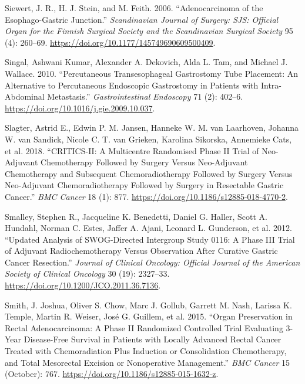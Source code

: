 \documentclass[
  letterpaper,
]{scrbook}
\newlength{\cslhangindent}
\newenvironment{CSLReferences}[2] %
 {\begin{list}{}{%
  \setlength{\itemindent}{0pt}
  \setlength{\leftmargin}{0pt}
  \setlength{\parsep}{0pt}
  \ifodd #1
   \setlength{\leftmargin}{\cslhangindent}
   \setlength{\itemindent}{-1\cslhangindent}
  \fi
  \setlength{\itemsep}{#2\baselineskip}}}
 {\end{list}}
\begin{document}
\begin{CSLReferences}{1}{0}
Siewert, J. R., H. J. Stein, and M. Feith. 2006. {``Adenocarcinoma of
the Esophago-Gastric Junction.''} \emph{Scandinavian Journal of Surgery:
SJS: Official Organ for the Finnish Surgical Society and the
Scandinavian Surgical Society} 95 (4): 260--69.
\url{https://doi.org/10.1177/145749690609500409}.

Singal, Ashwani Kumar, Alexander A. Dekovich, Alda L. Tam, and Michael
J. Wallace. 2010. {``Percutaneous Transesophageal Gastrostomy Tube
Placement: An Alternative to Percutaneous Endoscopic Gastrostomy in
Patients with Intra-Abdominal Metastasis.''} \emph{Gastrointestinal
Endoscopy} 71 (2): 402--6.
\url{https://doi.org/10.1016/j.gie.2009.10.037}.

Slagter, Astrid E., Edwin P. M. Jansen, Hanneke W. M. van Laarhoven,
Johanna W. van Sandick, Nicole C. T. van Grieken, Karolina Sikorska,
Annemieke Cats, et al. 2018. {``{CRITICS}-{II}: A Multicentre Randomised
Phase {II} Trial of Neo-Adjuvant Chemotherapy Followed by Surgery Versus
Neo-Adjuvant Chemotherapy and Subsequent Chemoradiotherapy Followed by
Surgery Versus Neo-Adjuvant Chemoradiotherapy Followed by Surgery in
Resectable Gastric Cancer.''} \emph{BMC Cancer} 18 (1): 877.
\url{https://doi.org/10.1186/s12885-018-4770-2}.

Smalley, Stephen R., Jacqueline K. Benedetti, Daniel G. Haller, Scott A.
Hundahl, Norman C. Estes, Jaffer A. Ajani, Leonard L. Gunderson, et al.
2012. {``Updated Analysis of {SWOG}-Directed Intergroup Study 0116: A
Phase {III} Trial of Adjuvant Radiochemotherapy Versus Observation After
Curative Gastric Cancer Resection.''} \emph{Journal of Clinical
Oncology: Official Journal of the American Society of Clinical Oncology}
30 (19): 2327--33. \url{https://doi.org/10.1200/JCO.2011.36.7136}.

Smith, J. Joshua, Oliver S. Chow, Marc J. Gollub, Garrett M. Nash,
Larissa K. Temple, Martin R. Weiser, José G. Guillem, et al. 2015.
{``Organ {Preservation} in {Rectal} {Adenocarcinoma}: A Phase {II}
Randomized Controlled Trial Evaluating 3-Year Disease-Free Survival in
Patients with Locally Advanced Rectal Cancer Treated with Chemoradiation
Plus Induction or Consolidation Chemotherapy, and Total Mesorectal
Excision or Nonoperative Management.''} \emph{BMC Cancer} 15 (October):
767. \url{https://doi.org/10.1186/s12885-015-1632-z}.


\end{CSLReferences}
\end{document}
